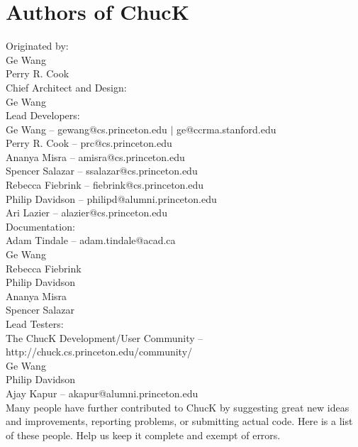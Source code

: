 \newpage
\section{Authors of ChucK}

Originated by:\\
\authtab Ge Wang\\
\authtab Perry R. Cook\\

Chief Architect and Design:\\
\authtab Ge Wang\\

Lead Developers:\\
\authtab Ge Wang -- gewang@cs.princeton.edu $|$ ge@ccrma.stanford.edu\\
\authtab Perry R. Cook -- prc@cs.princeton.edu\\
\authtab Ananya Misra -- amisra@cs.princeton.edu\\
\authtab Spencer Salazar -- ssalazar@cs.princeton.edu\\
\authtab Rebecca Fiebrink -- fiebrink@cs.princeton.edu\\
\authtab Philip Davidson -- philipd@alumni.princeton.edu\\
\authtab Ari Lazier -- alazier@cs.princeton.edu\\

Documentation:\\
\authtab Adam Tindale -- adam.tindale@acad.ca\\
\authtab Ge Wang\\
\authtab Rebecca Fiebrink\\
\authtab Philip Davidson\\
\authtab Ananya Misra\\
\authtab Spencer Salazar\\

Lead Testers:\\
\authtab The ChucK Development/User Community -- http://chuck.cs.princeton.edu/community/\\
\authtab Ge Wang\\
\authtab Philip Davidson\\
\authtab Ajay Kapur -- akapur@alumni.princeton.edu\\


Many people have further contributed to ChucK by suggesting great new ideas and improvements, reporting problems, or submitting actual code. Here is a list of these people.  Help us keep it complete and exempt of errors.

